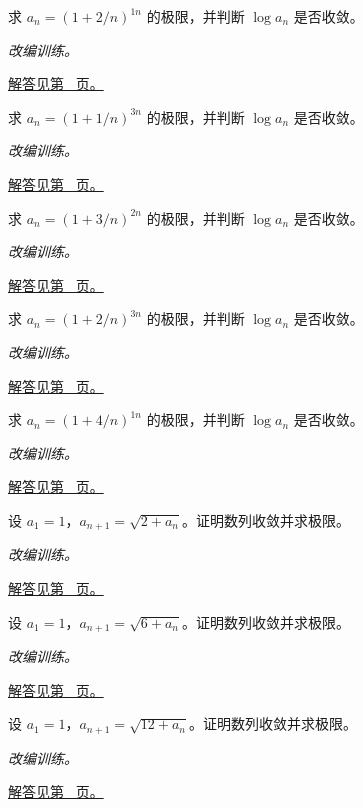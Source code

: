 \documentclass[UTF8,12pt,a4paper,fontset=fandol]{ctexart}
\begin{document}
\begin{example}[指数型数列]\label{ex:c1q14}
求 $a_n=(1+2/n)^{1n}$ 的极限，并判断 $\log a_n$ 是否收敛。
\par\textit{改编训练。}\par\hyperref[ans:c1q14]{解答见第~\pageref{ans:c1q14} 页。}
\end{example}
\begin{example}[指数型数列]\label{ex:c1q15}
求 $a_n=(1+1/n)^{3n}$ 的极限，并判断 $\log a_n$ 是否收敛。
\par\textit{改编训练。}\par\hyperref[ans:c1q15]{解答见第~\pageref{ans:c1q15} 页。}
\end{example}
\begin{example}[指数型数列]\label{ex:c1q16}
求 $a_n=(1+3/n)^{2n}$ 的极限，并判断 $\log a_n$ 是否收敛。
\par\textit{改编训练。}\par\hyperref[ans:c1q16]{解答见第~\pageref{ans:c1q16} 页。}
\end{example}
\begin{example}[指数型数列]\label{ex:c1q17}
求 $a_n=(1+2/n)^{3n}$ 的极限，并判断 $\log a_n$ 是否收敛。
\par\textit{改编训练。}\par\hyperref[ans:c1q17]{解答见第~\pageref{ans:c1q17} 页。}
\end{example}
\begin{example}[指数型数列]\label{ex:c1q18}
求 $a_n=(1+4/n)^{1n}$ 的极限，并判断 $\log a_n$ 是否收敛。
\par\textit{改编训练。}\par\hyperref[ans:c1q18]{解答见第~\pageref{ans:c1q18} 页。}
\end{example}
\begin{example}[根式递推与单调有界]\label{ex:c1q19}
设 $a_1=1$，$a_{n+1}=\sqrt{2+a_n}$。证明数列收敛并求极限。
\par\textit{改编训练。}\par\hyperref[ans:c1q19]{解答见第~\pageref{ans:c1q19} 页。}
\end{example}
\begin{example}[根式递推与单调有界]\label{ex:c1q20}
设 $a_1=1$，$a_{n+1}=\sqrt{6+a_n}$。证明数列收敛并求极限。
\par\textit{改编训练。}\par\hyperref[ans:c1q20]{解答见第~\pageref{ans:c1q20} 页。}
\end{example}
\begin{example}[根式递推与单调有界]\label{ex:c1q21}
设 $a_1=1$，$a_{n+1}=\sqrt{12+a_n}$。证明数列收敛并求极限。
\par\textit{改编训练。}\par\hyperref[ans:c1q21]{解答见第~\pageref{ans:c1q21} 页。}
\end{example}
\end{document}
